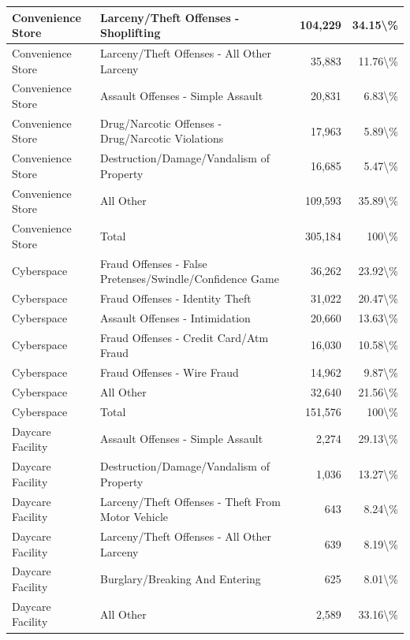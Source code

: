 \documentclass[
]{krantz}
\begin{document}
\begin{longtable}[t]{l|l|r|r}
\hline
Convenience Store & Larceny/Theft Offenses - Shoplifting & 104,229 & 34.15\textbackslash{}\%\\
\hline
Convenience Store & Larceny/Theft Offenses - All Other Larceny & 35,883 & 11.76\textbackslash{}\%\\
\hline
Convenience Store & Assault Offenses - Simple Assault & 20,831 & 6.83\textbackslash{}\%\\
\hline
Convenience Store & Drug/Narcotic Offenses - Drug/Narcotic Violations & 17,963 & 5.89\textbackslash{}\%\\
\hline
Convenience Store & Destruction/Damage/Vandalism of Property & 16,685 & 5.47\textbackslash{}\%\\
\hline
Convenience Store & All Other & 109,593 & 35.89\textbackslash{}\%\\
\hline
Convenience Store & Total & 305,184 & 100\textbackslash{}\%\\
\hline
Cyberspace & Fraud Offenses - False Pretenses/Swindle/Confidence Game & 36,262 & 23.92\textbackslash{}\%\\
\hline
Cyberspace & Fraud Offenses - Identity Theft & 31,022 & 20.47\textbackslash{}\%\\
\hline
Cyberspace & Assault Offenses - Intimidation & 20,660 & 13.63\textbackslash{}\%\\
\hline
Cyberspace & Fraud Offenses - Credit Card/Atm Fraud & 16,030 & 10.58\textbackslash{}\%\\
\hline
Cyberspace & Fraud Offenses - Wire Fraud & 14,962 & 9.87\textbackslash{}\%\\
\hline
Cyberspace & All Other & 32,640 & 21.56\textbackslash{}\%\\
\hline
Cyberspace & Total & 151,576 & 100\textbackslash{}\%\\
\hline
Daycare Facility & Assault Offenses - Simple Assault & 2,274 & 29.13\textbackslash{}\%\\
\hline
Daycare Facility & Destruction/Damage/Vandalism of Property & 1,036 & 13.27\textbackslash{}\%\\
\hline
Daycare Facility & Larceny/Theft Offenses - Theft From Motor Vehicle & 643 & 8.24\textbackslash{}\%\\
\hline
Daycare Facility & Larceny/Theft Offenses - All Other Larceny & 639 & 8.19\textbackslash{}\%\\
\hline
Daycare Facility & Burglary/Breaking And Entering & 625 & 8.01\textbackslash{}\%\\
\hline
Daycare Facility & All Other & 2,589 & 33.16\textbackslash{}\%\\

\end{longtable}
\end{document}
